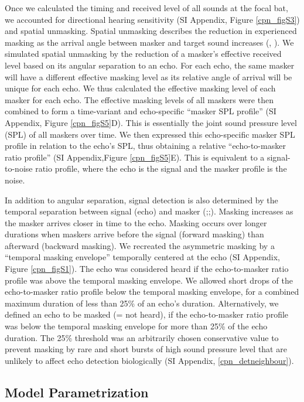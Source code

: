 \documentclass[
]{book}
\begin{document}
Once we calculated the timing and received level of all sounds at the focal bat, we accounted for directional hearing sensitivity (SI Appendix, Figure \ref{cpn_figS3}) and spatial unmasking. Spatial unmasking describes the reduction in experienced masking as the arrival angle between masker and target sound increases (\citet{ebata2003a}, \citet{suemer2009a}). We simulated spatial unmasking by the reduction of a masker's effective received level based on its angular separation to an echo. For each echo, the same masker will have a different effective masking level as its relative angle of arrival will be unique for each echo. We thus calculated the effective masking level of each masker for each echo. The effective masking levels of all maskers were then combined to form a time-variant and echo-specific ``masker SPL profile'' (SI Appendix, Figure \ref{cpn_figS5}D). This is essentially the joint sound pressure level (SPL) of all maskers over time. We then expressed this echo-specific masker SPL profile in relation to the echo's SPL, thus obtaining a relative ``echo-to-masker ratio profile'' (SI Appendix,Figure \ref{cpn_figS5}E). This is equivalent to a signal-to-noise ratio profile, where the echo is the signal and the masker profile is the noise.

In addition to angular separation, signal detection is also determined by the temporal separation between signal (echo) and masker (\citet{m1989a};\citet{yost2007a};\citet{siewert2004a}). Masking increases as the masker arrives closer in time to the echo. Masking occurs over longer durations when maskers arrive before the signal (forward masking) than afterward (backward masking). We recreated the asymmetric masking by a ``temporal masking envelope'' temporally centered at the echo (SI Appendix, Figure \ref{cpn_figS1}). The echo was considered heard if the echo-to-masker ratio profile was above the temporal masking envelope. We allowed short drops of the echo-to-masker ratio profile below the temporal masking envelope, for a combined maximum duration of less than 25\% of an echo's duration. Alternatively, we defined an echo to be masked (= not heard), if the echo-to-masker ratio profile was below the temporal masking envelope for more than 25\% of the echo duration. The 25\% threshold was an arbitrarily chosen conservative value to prevent masking by rare and short bursts of high sound pressure level that are unlikely to affect echo detection biologically (SI Appendix, \ref{cpn_detneighbour}).

\hypertarget{model-parametrization}{%
\subsection{Model Parametrization}\label{model-parametrization}}
\end{document}
